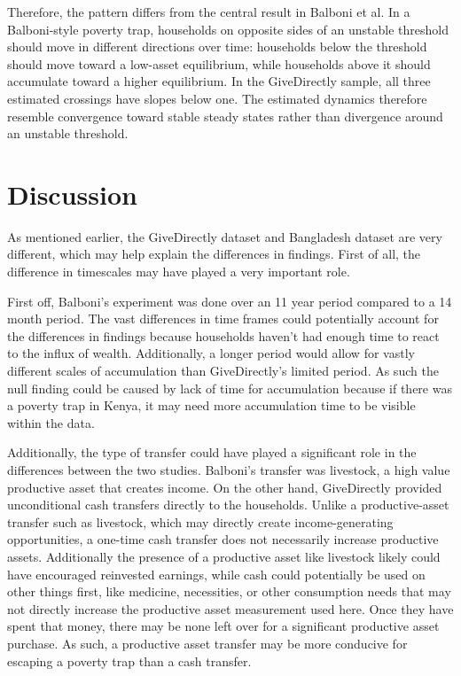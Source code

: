 \documentclass[9pt,twoside]{pnas-new}
\begin{document}
Therefore, the pattern differs from the central result in Balboni et al. In a Balboni-style poverty trap, households on opposite sides of an unstable threshold should move in different directions over time: households below the threshold should move toward a low-asset equilibrium, while households above it should accumulate toward a higher equilibrium. In the GiveDirectly sample, all three estimated crossings have slopes below one. The estimated dynamics therefore resemble convergence toward stable steady states rather than divergence around an unstable threshold.



\section{Discussion}


As mentioned earlier, the GiveDirectly dataset and Bangladesh dataset are very different,
which may help explain the differences in findings. First of all, the difference in timescales may
have played a very important role.


First off, Balboni's experiment was done over an 11 year period compared to a 14 month period. The vast differences in time frames could potentially account for the differences in findings because households haven't had enough time to react to the influx of wealth. Additionally, a longer period would allow for
vastly different scales of accumulation than GiveDirectly's limited period. As such the null
finding could be caused by lack of time for accumulation because if there was a poverty trap in Kenya, it may need more accumulation time to be visible within the data.


Additionally, the type of transfer could have played a significant role in the differences between the two studies. Balboni's transfer was livestock, a high value productive asset that creates income. On the other hand, GiveDirectly provided unconditional cash transfers directly to the households. Unlike a productive-asset transfer such as livestock, which may directly create income-generating opportunities, a one-time cash transfer does not necessarily increase productive assets. Additionally the presence of a productive asset like livestock likely could have encouraged reinvested earnings, while cash could potentially be used
on other things first, like medicine, necessities, or other consumption needs that may not directly increase the productive asset measurement used here. Once they have spent that money, there may be none left over for a significant productive asset purchase. As such, a productive asset transfer may be more conducive for escaping a poverty trap than a cash transfer. 
\end{document}
